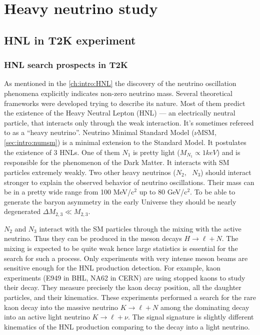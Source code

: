 \documentclass[../main.tex]{subfiles}
\begin{document}
\renewcommand{\labelitemi}{\ding{226}}
\renewcommand{\labelitemii}{\ding{227}}

\part{Heavy neutrino study}

\chapter{HNL in T2K experiment}
\section{HNL search prospects in T2K}
\label{ch:hnl}

As mentioned in the \autoref{ch:intro:HNL} the discovery of the neutrino oscillation phenomena explicitly indicates non-zero neutrino mass. Several theoretical frameworks were developed trying to describe its nature. Most of them predict the existence of the Heavy Neutral Lepton (HNL) --- an electrically neutral particle, that interacts only through the weak interaction. It's sometimes refereed to as a ``heavy neutrino''. Neutrino Minimal Standard Model ($\nu$MSM, \autoref{sec:intro:numsm}) is a minimal extension to the Standard Model. It postulates the existence of 3 HNLs. One of them $N_1$ is pretty light ($M_{N_1}\propto1keV$) and is responsible for the phenomenon of the Dark Matter. It interacts with SM particles extremely weakly. Two other heavy neutrinos ($N_2,\text{ }N_3$) should interact stronger to explain the observed behavior of neutrino oscillations. Their mass can be in a pretty wide range from 100 MeV/$\text{c}^2$ up to 80 GeV/$\text{c}^2$. To be able to generate the baryon asymmetry in the early Universe they should be nearly degenerated $\Delta M_{2,3}\ll M_{2,3}$.

$N_2$ and $N_3$ interact with the SM particles through the mixing with the active neutrino. Thus they can be produced in the meson decays $H\to\ell+N$. The mixing is expected to be quite weak hence large statistics is essential for the search for such a process. Only experiments with very intense meson beams are sensitive enough for the HNL production detection. For example, kaon experiments (E949 in BHL, NA62 in CERN) are using stopped kaons to study their decay. They measure precisely the kaon decay position, all the daughter particles, and their kinematics. These experiments performed a search for the rare kaon decay into the massive neutrino $K\to\ell+N$ among the dominating decay into an active light neutrino $K\to\ell+\nu$. The signal signature is slightly different kinematics of the HNL production comparing to the decay into a light neutrino.
\end{document}
